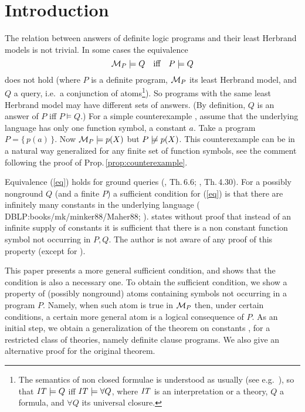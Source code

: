 \documentclass[a4paper]{tlp2}
\newcommand*{\notmodels}{\mathrel{\,\not\!\models}}
\newcommand*{\M}{{\ensuremath{\cal M}}\xspace}
\begin{document}
\section{Introduction}
The relation between answers of definite logic programs and their least Herbrand
models is not trivial.
In some cases the equivalence
\begin{equation}
\label{eq}
    \M_P\models Q \ \ \mbox{ iff } \ \ P\models Q  
\end{equation}
does not hold
(where $P$ is a definite program, $\M_P$ its least Herbrand model, and $Q$ a
query, i.e.\ a conjunction of atoms\footnote
{The semantics of non closed formulae is understood as usually
(see e.g.\  \cite{vanDalen,Apt-Prolog}),
so that ${\it IT}\models Q$ iff
${\it IT}\models\forall Q$, where ${\it IT}$ is an interpretation or a
theory,  $Q$ a formula, and $\forall Q$ its
universal closure.}).
So programs with the same least Herbrand model may have different sets of
answers. 
(By definition, $Q$ is an answer of $P$ iff $P\models Q$.)
For a simple counterexample \cite[Exercise 4.5]{Doets},
assume that the underlying language has only one function symbol, a constant $a$.
Take a program $P=\{\, p(a)\,\}$.  
Now $\M_P\models p(X)$ but $P\notmodels p(X)$.
This counterexample can be in a natural way generalized for any  finite set
of function symbols,
see the comment following the proof of Prop.\,\ref{prop:counterexample}.



Equivalence (\ref{eq}) holds for ground queries
(, Th.\,6.6;\,\,, Th.\,4.30).
For a possibly nonground $Q$ (and a finite $P$)
a sufficient condition for (\ref{eq})
is that there are infinitely many constants in the
underlying language
(\citeNP
{DBLP:books/mk/minker88/Maher88};  ).
 states without proof
that instead of an infinite supply of constants it is sufficient that there is
a non constant function symbol not occurring in $P,Q$. 
The author is not aware of any proof of this property
(except for \cite[Appendix]{drabent.arxiv.coco14}).

This paper presents a more general sufficient condition,
and shows that the condition is also a necessary one.
To obtain the sufficient condition, we show a property of (possibly
nonground) atoms containing symbols not occurring in a program $P$. 
Namely, when such atom is true in $\M_P$ then, under certain conditions, a
certain more general atom is a logical consequence of $P$.
As an initial step, we obtain
a generalization of the theorem on constants \cite{shoenfield67},
for a restricted class of theories, namely definite clause programs.
We also give an alternative proof for the original theorem.
\end{document}
